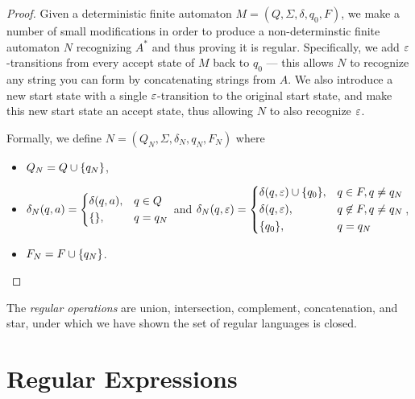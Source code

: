 \begin{proof}
    Given a deterministic finite automaton $M = (Q, \Sigma, \delta, q_0, F)$, we make a number of small modifications in order to produce a non-determinstic finite automaton $N$ recognizing $A^{*}$ and thus proving it is regular. Specifically, we add $\varepsilon$-transitions from every accept state of $M$ back to $q_0$ --- this allows $N$ to recognize any string you can form by concatenating strings from $A$. We also introduce a new start state with a single $\varepsilon$-transition to the original start state, and make this new start state an accept state, thus allowing $N$ to also recognize $\varepsilon$.

    Formally, we define $N = (Q_N, \Sigma, \delta_N, q_N, F_N)$ where
    \begin{itemize}
        \item $Q_N = Q \cup \{q_N\}$,
        \item $\delta_N(q, a) = \begin{dcases}
            \delta(q, a), &q \in Q \\
            \{\}, &q = q_N \\
        \end{dcases}$ and $\delta_N(q, \varepsilon) = \begin{dcases}
            \delta(q, \varepsilon) \cup \{q_0\}, &q \in F, q \neq q_N \\
            \delta(q, \varepsilon), &q \not\in F, q \neq q_N \\
            \{q_0\}, &q = q_N \\
        \end{dcases}$,
        \item $F_N = F \cup \{q_N\}$.
    \end{itemize}
\end{proof}

\begin{defn}
    The \emph{regular operations} are union, intersection, complement, concatenation, and star, under which we have shown the set of regular languages is closed.
\end{defn}

\section{Regular Expressions}

